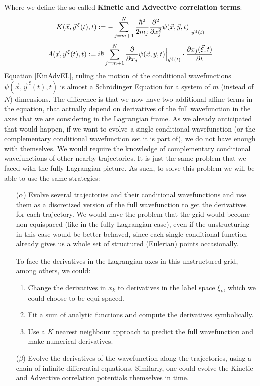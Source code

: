 \documentclass[11pt, a4paper]{article} %
\begin{document}
Where we define the so called {\bf Kinetic and Advective correlation terms}:
\begin{equation}\label{KinEL}
K(\vec{x}, \vec{y}^{\, \xi}(t),t):=-\sum_{j=m+1}^N \frac{\hbar^2}{2m_j}\pdv[2]{}{x_j} \psi(\vec{x}, \vec{y},t)\Big\rvert_{\vec{y}^{\, \xi}(t)}
\end{equation}
\begin{equation}\label{AdvEL}
A(\vec{x}, \vec{y}^{\, \xi}(t),t):=i\hbar\sum_{j=m+1}^N \pdv{}{x_j}\psi(\vec{x}, \vec{y},t)\Big\rvert_{\vec{y}^{\, \xi}(t)}\cdot \pdv{x_j(\vec{\xi},t)}{t}
\end{equation}
Equation \eqref{KinAdvEL}, ruling the motion of the conditional wavefunctions $\psi(\vec{x}, \vec{y}^{\, \xi}(t),t)$ is almost a Schrödinger Equation for a system of $m$ (instead of $N$) dimensions. The difference is that we now have two additional affine terms in the equation, that actually depend on derivatives of the full wavefunction in the axes that we are considering in the Lagrangian frame. As we already anticipated that would happen, if we want to evolve a single conditional wavefunction (or the complementary conditional wavefunction set it is part of), we do not have enough with themselves. We would require the knowledge of complementary conditional wavefunctions of other nearby trajectories. It is just the same problem that we faced with the fully Lagrangian picture. As such, to solve this problem we will be able to use the same strategies: 
\begin{enumerate}
\item[($\alpha$)] Evolve several trajectories and their conditional wavefunctions and use them as a discretized version of the full wavefunction to get the derivatives for each trajectory. We would have the problem that the grid would become non-equispaced (like in the fully Lagrangian case), even if the unstructuring in this case would be better behaved, since each single conditional function already gives us a whole set of structured (Eulerian) points occasionally.

To face the derivatives in the Lagrangian axes in this unstructured grid, among others, we could:
\begin{enumerate}
\item Change the derivatives in $x_k$ to derivatives in the label space $\xi_k$, which we could choose to be equi-spaced.
\item Fit a sum of analytic functions and compute the derivatives symbolically.
\item Use a $K$ nearest neighbour approach to predict the full wavefunction and make numerical derivatives.
\end{enumerate}

\item[($\beta$)] Evolve the derivatives of the wavefunction along the trajectories, using a chain of infinite differential equations. Similarly, one could evolve the Kinetic and Advective correlation potentials themselves in time.
\end{enumerate}
\end{document}
